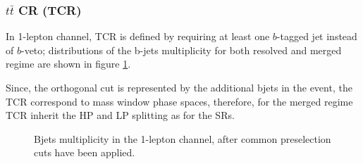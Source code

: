 
\subsubsection{$t\bar{t}$ CR (TCR)}


In 1-lepton channel, TCR is defined by requiring at least one $b$-tagged jet instead of $b$-veto; distributions of the b-jets multiplicity for both resolved and merged regime are shown in figure \ref{fig:1lepNBjetsPresel}. 

Since, the orthogonal cut is represented by the additional bjets in the event, 
the TCR correspond to mass window phase spaces, therefore, for the merged regime
TCR inherit the HP and LP splitting as for the SRs.

\begin{figure}[ht]
    \centering
    \caption{ Bjets multiplicity in the 1-lepton channel, after common preselection cuts have been applied. }
    \label{fig:1lepNBjetsPresel}
\end{figure}

